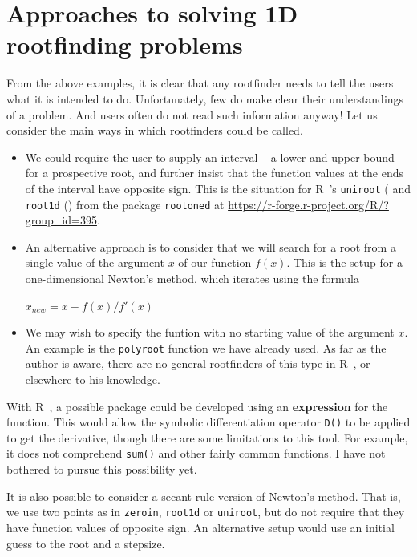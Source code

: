 \documentclass[11pt,letterpaper]{article}
\newcommand{\R}{{\sf R\ }}
\begin{document}
\section{Approaches to solving 1D rootfinding problems}

From the above examples, it is clear that any rootfinder needs to tell the users what it
is intended to do. Unfortunately, few do make clear their understandings of a problem. And
users often do not read such information anyway! Let us consider the main ways in which
rootfinders could be called.

\begin{itemize}
\item{We could require the user to supply an interval -- a lower and upper bound
for a prospective root, and further insist that the function values at the ends of
the interval have opposite sign. This is the situation for 
\R's \texttt{uniroot} (\cite{brent73} and \texttt{root1d} (\cite{jncnm79}) 
from the package \texttt{rootoned}
at \url{https://r-forge.r-project.org/R/?group_id=395}.}
\item{An alternative approach is to consider that we will search for a root from
a single value of the argument $x$ of our function $f(x)$. This is the setup for 
a one-dimensional Newton's method, which iterates using the formula

$  x_{new} = x - f(x) / f'(x) $

}
\item{We may wish to specify the funtion with no starting value of the argument $x$. An
example is the \texttt{polyroot} function we have already used. As far as the author is
aware, there are no general rootfinders of this type in \R, or elsewhere to his 
knowledge.}
\end{itemize}

With \R, a possible package could be developed using an \textbf{expression} for the 
function. This would allow the symbolic differentiation operator \texttt{D()} to be 
applied to get the derivative, though there are some limitations to this tool. For
example, it does not comprehend \texttt{sum()} and other fairly common functions. I
have not bothered to pursue this possibility yet.

It is also possible to consider a secant-rule version of Newton's method. That is, we
use two points as in \texttt{zeroin}, \texttt{root1d} or \texttt{uniroot}, but do not
require that they have function values of opposite sign. An alternative setup would use
an initial guess to the root and a stepsize.
\end{document}
